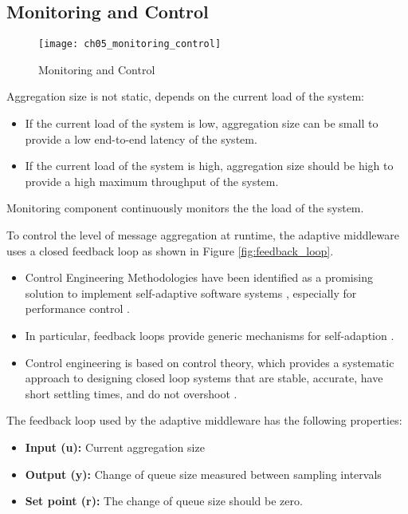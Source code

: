 \subsection{Monitoring and Control}

\begin{figure}[htbp]
	\centering
	\texttt{[image: ch05\_monitoring\_control]}
	\caption{Monitoring and Control}
	\label{fig:ch05_monitoring_control}
\end{figure}

Aggregation size is not static, depends on the current load of the system:
\begin{itemize}
	\item If the current load of the system is low, aggregation size can be small to provide a low end-to-end latency of the system.
	\item If the current load of the system is high, aggregation size should be high to provide a high maximum throughput of the system. 
\end{itemize}

Monitoring component continuously monitors the the load of the system. 

To control the level of message aggregation at runtime, the adaptive middleware uses a closed feedback loop as shown in Figure \ref{fig:feedback_loop}.

\begin{itemize}
	\item Control Engineering Methodologies have been identified as a promising solution to implement self-adaptive software systems \citep{Patikirikorala:2012ky}, especially for performance control \citep{Abdelzaher:2003ea}.
	\item In particular, feedback loops provide generic mechanisms for self-adaption \citep{Brun:2009ww}. 
	\item Control engineering is based on control theory, which provides a systematic approach to designing closed loop systems that are stable, accurate, have short settling times, and do not overshoot \citep{Abdelzaher:2008ub}.
\end{itemize}

The feedback loop used by the adaptive middleware has the following properties:

\begin{itemize}
	\item \textbf{Input (u):} Current aggregation size
	\item \textbf{Output (y):} Change of queue size measured between sampling intervals
	\item \textbf{Set point (r):} The change of queue size should be zero.
\end{itemize}

